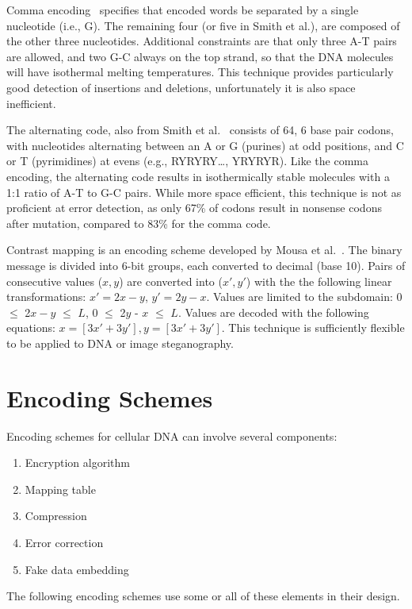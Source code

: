 \documentclass[USenglish,oneside,twocolumn]{article}
\begin{document}
Comma encoding~\cite{BVSPNAS2000} specifies that encoded words be separated by a single nucleotide (i.e., G). The remaining four (or five in Smith et al.), are composed of the other three nucleotides. Additional constraints are that only three A-T pairs are allowed, and two G-C always on the top strand, so that the DNA molecules will have isothermal melting temperatures. This technique provides particularly good detection of insertions and deletions, unfortunately it is also space inefficient.

The alternating code, also from Smith et al.~\cite{SFHC2003BL} consists of 64, 6 base pair codons, with nucleotides alternating between an A or G (purines) at odd positions, and C or T (pyrimidines) at evens (e.g., RYRYRY…, YRYRYR). Like the comma encoding, the alternating code results in isothermically stable molecules with a 1:1 ratio of A-T to G-C pairs. While more space efficient, this technique is not as proficient at error detection, as only 67\% of codons result in nonsense codons after mutation, compared to 83\% for the comma code.

Contrast mapping is an encoding scheme developed by Mousa et al.~\cite{MMAIAJI2011}. The binary message is divided into 6-bit groups, each converted to decimal (base 10). Pairs of consecutive values ($x, y$) are converted into ($x', y'$) with the the following linear transformations: $x' = 2x - y$,  $y' = 2y - x$. Values are limited to the subdomain:  0 $\leq$ 2$x - y$ $\leq$ $L$, 0 $\leq$ 2$y$ - $x$ $\leq$ $L$. Values are decoded with the following equations: $x = [3x' + 3y'], y = [3 x' + 3y']$. This technique is sufficiently flexible to be applied to DNA or image steganography.

\section{Encoding Schemes}

Encoding schemes for cellular DNA can involve several components:

\begin{enumerate}
\item Encryption algorithm
\item Mapping table
\item Compression
\item Error correction
\item Fake data embedding
\end{enumerate}

The following encoding schemes use some or all of these elements in their design.
\end{document}
